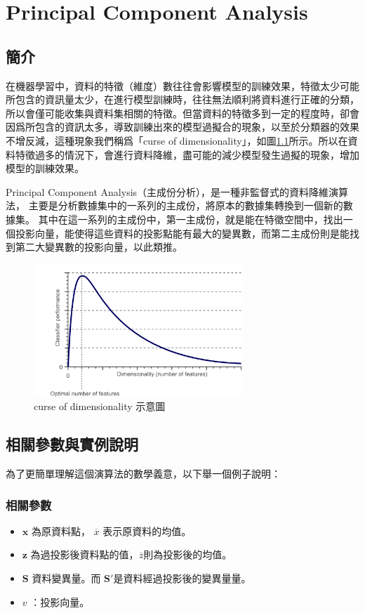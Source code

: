 \chapter{Principal Component Analysis}
\label{chapter:pca}
\section{簡介}
\label{sec:introduction}


在機器學習中，資料的特徵（維度）數往往會影響模型的訓練效果，特徵太少可能所包含的資訊量太少，在進行模型訓練時，往往無法順利將資料進行正確的分類，所以會僅可能收集與資料集相關的特徵。但當資料的特徵多到一定的程度時，卻會因爲所包含的資訊太多，導致訓練出來的模型過擬合的現象，以至於分類器的效果不增反減，這種現象我們稱爲「curse of dimensionality」，如圖\ref{fig:CurseOfDimesionality}所示。所以在資料特徵過多的情況下，會進行資料降維，盡可能的減少模型發生過擬的現象，增加模型的訓練效果。

Principal Component Analysis（主成份分析），是一種非監督式的資料降維演算法，
主要是分析數據集中的一系列的主成份，將原本的數據集轉換到一個新的數據集。
其中在這一系列的主成份中，第一主成份，就是能在特徵空間中，找出一個投影向量，能使得這些資料的投影點能有最大的變異數，而第二主成份則是能找到第二大變異數的投影向量，以此類推。




\begin{figure}[h]
	\centering
	\includegraphics[height=5cm]{./pic/NZgacRXF.png}
	\caption{curse of dimensionality 示意圖}
	\label{fig:CurseOfDimesionality}
\end{figure}

\section{相關參數與實例說明}
為了更簡單理解這個演算法的數學義意，以下舉一個例子說明：

\subsection{相關參數}
\begin{itemize}
	\item
		\(\mathbf{x}\) 為原資料點， \(\overline{x}\) 表示原資料的均值。
	\item
	     \(\mathbf{z}\) 為過投影後資料點的值，\(\overline{z}\)則為投影後的均值。 
	\item
	      \(\mathbf{S}\) 資料變異量。而 \(\mathbf{{S}'}\)是資料經過投影後的變異量量。
	\item
	      \(v\) ：投影向量。
\end{itemize}


